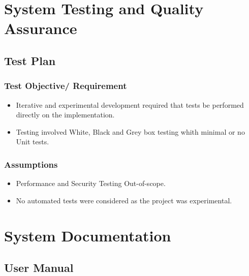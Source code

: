 \documentclass[11pt]{article}
\begin{document}
\section{System Testing and Quality Assurance}
\label{sec-3}
\subsection{Test Plan}
\label{sec-3-1}
\subsubsection{Test Objective/ Requirement}
\label{sec-3-1-1}
\begin{itemize}
\item Iterative and experimental development required that tests be performed directly on the implementation.
\item Testing involved White, Black and Grey box testing whith minimal or no Unit tests.
\end{itemize}
\subsubsection{Assumptions}
\label{sec-3-1-2}
\begin{itemize}
\item Performance and Security Testing Out-of-scope.
\item No automated tests were considered as the project was experimental.
\end{itemize}


\section{System Documentation}
\label{sec-4}
\subsection{User Manual}
\label{sec-4-1}
\end{document}

